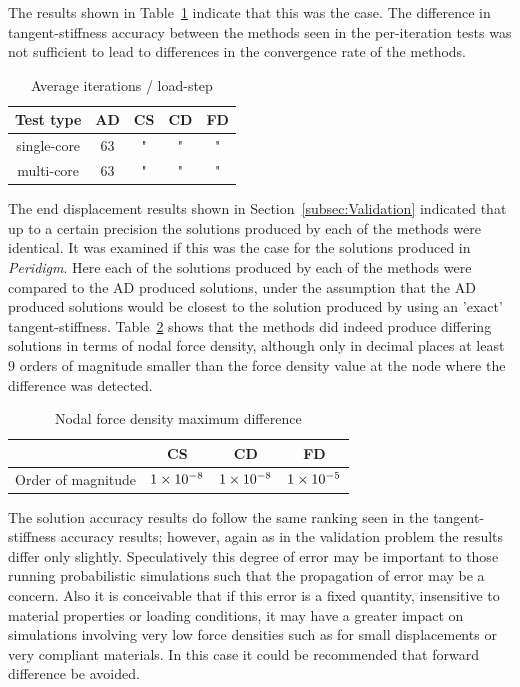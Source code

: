\documentclass[preprint,12pt]{elsarticle}
\begin{document}
The results shown in Table~\ref{tab:ConvergenceStudy2} indicate that this was the case.  The difference in tangent-stiffness accuracy between the methods seen in the per-iteration tests was not sufficient to lead to differences in the convergence rate of the methods.
%
\begin{table}[htb]   
    \centering 
    \caption{Average iterations / load-step} 
    \label{tab:ConvergenceStudy2}   
    \begin{tabular}{c c c c c}
        \toprule 
        Test type & AD & CS & CD & FD\\
        \midrule 
        single-core & 63 & " & " & "\\ 
        multi-core  & 63 & " & " & "\\ 
        \bottomrule 
    \end{tabular} 
\end{table}

The end displacement results shown in Section~\ref{subsec:Validation} indicated that up to a certain precision the solutions produced by each of the methods were identical. It was examined if this was the case for the solutions produced in \emph{Peridigm}. Here each of the solutions produced by each of the methods were compared to the AD produced solutions, under the assumption that the AD produced solutions would be closest to the solution produced by using an 'exact' tangent-stiffness. Table~\ref{tab:PeridigmSolutionAccuracy} shows that the methods did indeed produce differing solutions in terms of nodal force density, although only in decimal places at least $9$ orders of magnitude smaller than the force density value at the node where the difference was detected.
%
\begin{table}[hbp]   
    \centering 
    \caption{Nodal force density maximum difference} 
    \label{tab:PeridigmSolutionAccuracy}   
    \begin{tabular}{c c c c}
        \toprule  & CS & CD & FD\\
        \midrule  Order of magnitude & $\num{1.E-8}$ & $\num{1.E-8}$ & $\num{1.E-5}$ \\ 
        \bottomrule 
    \end{tabular} 
\end{table}

The solution accuracy results do follow the same ranking seen in the tangent-stiffness accuracy results; however, again as in the validation problem the results differ only slightly. Speculatively this degree of error may be important to those running probabilistic simulations such that the propagation of error may be a concern. Also it is conceivable that if this error is a fixed quantity, insensitive to material properties or loading conditions, it may have a greater impact on simulations involving very low force densities such as for small displacements or very compliant materials. In this case it could be recommended that forward difference be avoided. 
%
\end{document}
